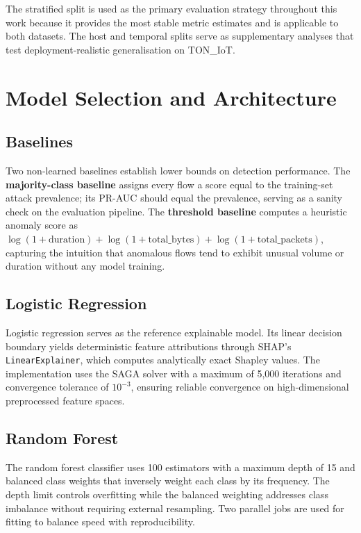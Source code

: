 \documentclass[12pt,a4paper]{report}
\begin{document}
The stratified split is used as the primary evaluation strategy throughout this work because it provides the most stable metric estimates and is applicable to both datasets. The host and temporal splits serve as supplementary analyses that test deployment-realistic generalisation on TON\_IoT.

\section{Model Selection and Architecture}
\label{sec:models}

\subsection{Baselines}
\label{sec:baselines}

Two non-learned baselines establish lower bounds on detection performance. The \textbf{majority-class baseline} assigns every flow a score equal to the training-set attack prevalence; its PR-AUC should equal the prevalence, serving as a sanity check on the evaluation pipeline. The \textbf{threshold baseline} computes a heuristic anomaly score as $\log(1 + \text{duration}) + \log(1 + \text{total\_bytes}) + \log(1 + \text{total\_packets})$, capturing the intuition that anomalous flows tend to exhibit unusual volume or duration without any model training.

\subsection{Logistic Regression}
\label{sec:logreg}

Logistic regression serves as the reference explainable model. Its linear decision boundary yields deterministic feature attributions through SHAP's \texttt{LinearExplainer}, which computes analytically exact Shapley values. The implementation uses the SAGA solver with a maximum of 5,000 iterations and convergence tolerance of $10^{-3}$, ensuring reliable convergence on high-dimensional preprocessed feature spaces.

\subsection{Random Forest}
\label{sec:rf}

The random forest classifier uses 100 estimators with a maximum depth of 15 and balanced class weights that inversely weight each class by its frequency. The depth limit controls overfitting while the balanced weighting addresses class imbalance without requiring external resampling. Two parallel jobs are used for fitting to balance speed with reproducibility.
\end{document}
